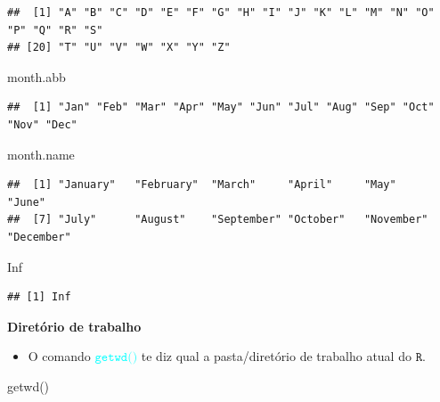 \documentclass[
]{book}
\newenvironment{Shaded}{\begin{snugshade}}{\end{snugshade}}
\newcommand{\ConstantTok}[1]{\textcolor[rgb]{0.00,0.00,0.00}{#1}}
\newcommand{\FunctionTok}[1]{\textcolor[rgb]{0.00,0.00,0.00}{#1}}
\newcommand{\NormalTok}[1]{#1}
\providecommand{\tightlist}{%
  \setlength{\itemsep}{0pt}\setlength{\parskip}{0pt}}
\begin{document}
\tiny

\begin{verbatim}
##  [1] "A" "B" "C" "D" "E" "F" "G" "H" "I" "J" "K" "L" "M" "N" "O" "P" "Q" "R" "S"
## [20] "T" "U" "V" "W" "X" "Y" "Z"
\end{verbatim}

\begin{Shaded}
\begin{Highlighting}[]
\NormalTok{month.abb}
\end{Highlighting}
\end{Shaded}

\tiny

\begin{verbatim}
##  [1] "Jan" "Feb" "Mar" "Apr" "May" "Jun" "Jul" "Aug" "Sep" "Oct" "Nov" "Dec"
\end{verbatim}

\normalsize

\begin{Shaded}
\begin{Highlighting}[]
\NormalTok{month.name}
\end{Highlighting}
\end{Shaded}

\tiny

\begin{verbatim}
##  [1] "January"   "February"  "March"     "April"     "May"       "June"     
##  [7] "July"      "August"    "September" "October"   "November"  "December"
\end{verbatim}

\normalsize

\begin{Shaded}
\begin{Highlighting}[]
\ConstantTok{Inf}
\end{Highlighting}
\end{Shaded}

\begin{verbatim}
## [1] Inf
\end{verbatim}

\textbf{Diretório de trabalho}

\begin{itemize}
\tightlist
\item
  O comando \textcolor{cyan}{$\texttt{getwd()}$} te diz qual a pasta/diretório de trabalho atual do \(\texttt{R}\).
\end{itemize}

\begin{Shaded}
\begin{Highlighting}[]
\FunctionTok{getwd}\NormalTok{()}
\end{Highlighting}
\end{Shaded}
\end{document}
